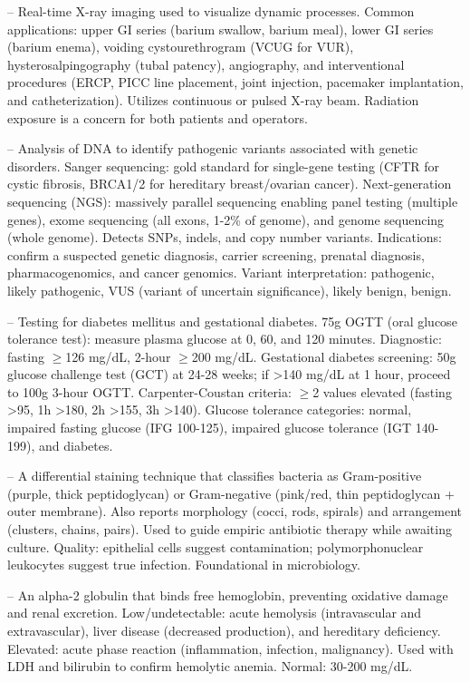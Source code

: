 -- Real-time X-ray imaging used to visualize dynamic processes. Common applications: upper GI series (barium swallow, barium meal), lower GI series (barium enema), voiding cystourethrogram (VCUG for VUR), hysterosalpingography (tubal patency), angiography, and interventional procedures (ERCP, PICC line placement, joint injection, pacemaker implantation, and catheterization). Utilizes continuous or pulsed X-ray beam. Radiation exposure is a concern for both patients and operators.

-- Analysis of DNA to identify pathogenic variants associated with genetic disorders. Sanger sequencing: gold standard for single-gene testing (CFTR for cystic fibrosis, BRCA1/2 for hereditary breast/ovarian cancer). Next-generation sequencing (NGS): massively parallel sequencing enabling panel testing (multiple genes), exome sequencing (all exons, 1-2\% of genome), and genome sequencing (whole genome). Detects SNPs, indels, and copy number variants. Indications: confirm a suspected genetic diagnosis, carrier screening, prenatal diagnosis, pharmacogenomics, and cancer genomics. Variant interpretation: pathogenic, likely pathogenic, VUS (variant of uncertain significance), likely benign, benign.

-- Testing for diabetes mellitus and gestational diabetes. 75g OGTT (oral glucose tolerance test): measure plasma glucose at 0, 60, and 120 minutes. Diagnostic: fasting \(\ge\)126 mg/dL, 2-hour \(\ge\)200 mg/dL. Gestational diabetes screening: 50g glucose challenge test (GCT) at 24-28 weeks; if >140 mg/dL at 1 hour, proceed to 100g 3-hour OGTT. Carpenter-Coustan criteria: \(\ge\)2 values elevated (fasting >95, 1h >180, 2h >155, 3h >140). Glucose tolerance categories: normal, impaired fasting glucose (IFG 100-125), impaired glucose tolerance (IGT 140-199), and diabetes.

-- A differential staining technique that classifies bacteria as Gram-positive (purple, thick peptidoglycan) or Gram-negative (pink/red, thin peptidoglycan + outer membrane). Also reports morphology (cocci, rods, spirals) and arrangement (clusters, chains, pairs). Used to guide empiric antibiotic therapy while awaiting culture. Quality: epithelial cells suggest contamination; polymorphonuclear leukocytes suggest true infection. Foundational in microbiology.

-- An alpha-2 globulin that binds free hemoglobin, preventing oxidative damage and renal excretion. Low/undetectable: acute hemolysis (intravascular and extravascular), liver disease (decreased production), and hereditary deficiency. Elevated: acute phase reaction (inflammation, infection, malignancy). Used with LDH and bilirubin to confirm hemolytic anemia. Normal: 30-200 mg/dL.

